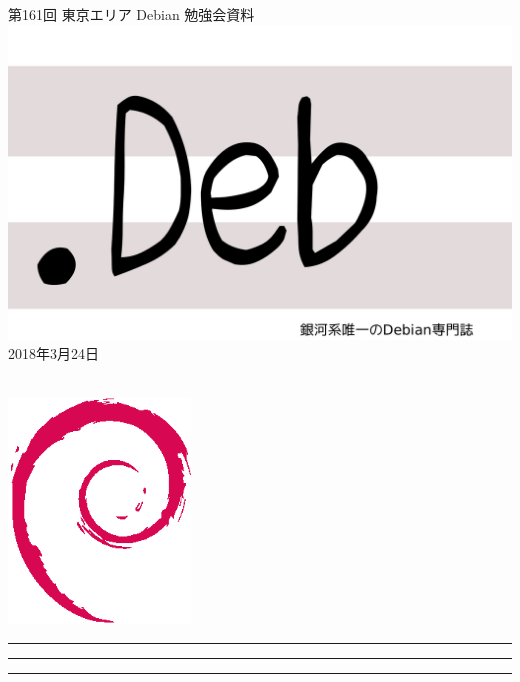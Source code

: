 \documentclass[mingoth,a4paper]{jsarticle}
\newcommand{\debmtgyear}{2018}
\newcommand{\debmtgmonth}{3}
\newcommand{\debmtgdate}{24}
\newcommand{\debmtgnumber}{161}
\begin{document}
\begin{titlepage}
\thispagestyle{empty}

\vspace*{-2cm}
第\debmtgnumber{}回 東京エリア Debian 勉強会資料\\
\hspace*{-2cm}
\includegraphics{image2012-natsu/dotdeb.pdf}\\
\hfill{}\debmtgyear{}年\debmtgmonth{}月\debmtgdate{}日

\\

\vspace*{-2cm}
\hfill{}\includegraphics[height=6cm]{image200502/openlogo-nd.eps}
\end{titlepage}

\newpage

\begin{minipage}[b]{0.2\hsize}
 \colorbox{titleback}{}
\end{minipage}
\begin{minipage}[b]{0.8\hsize}
\hrule
\vspace{2mm}
\hrule
\begin{multicols}{2}
\tableofcontents
\end{multicols}
\vspace{2mm}
\hrule
\end{minipage}
\end{document}
